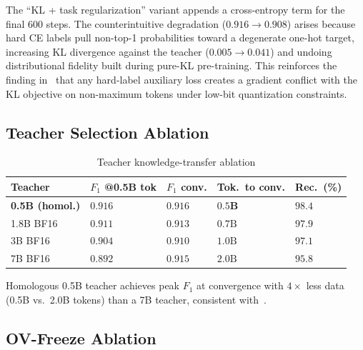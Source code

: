 \documentclass[lettersize,journal]{IEEEtran}
\begin{document}
The ``KL + task regularization'' variant appends a cross-entropy term
for the final 600 steps.  The counterintuitive degradation
($0.916\rightarrow0.908$) arises because hard CE labels pull
non-top-1 probabilities toward a degenerate one-hot target, increasing
KL divergence against the teacher ($0.005\rightarrow0.041$) and
undoing distributional fidelity built during pure-KL pre-training.
This reinforces the finding in~\cite{3} that any hard-label auxiliary
loss creates a gradient conflict with the KL objective on non-maximum
tokens under low-bit quantization constraints.

\subsection{Teacher Selection Ablation}

\begin{table}[htbp]
\caption{Teacher knowledge-transfer ablation}
\label{tab6}
\centering
\renewcommand{\arraystretch}{1.15}
\small
\setlength{\tabcolsep}{4pt}
\begin{tabular}{l>{\centering\arraybackslash}p{1.05cm}%
                 >{\centering\arraybackslash}p{1.0cm}%
                 >{\centering\arraybackslash}p{1.05cm}%
                 >{\centering\arraybackslash}p{1.0cm}}
\toprule
\textbf{Teacher} & \textbf{$F_1$ @0.5B tok} & \textbf{$F_1$ conv.} & \textbf{Tok.\ to conv.} & \textbf{Rec.\ (\%)} \\
\midrule
\textbf{0.5B (homol.)} & $\mathbf{0.916}$ & $\mathbf{0.916}$ & $\mathbf{0.5\text{B}}$ & $\mathbf{98.4}$ \\
1.8B BF16 & $0.911$ & $0.913$ & $0.7\text{B}$ & $97.9$ \\
3B BF16   & $0.904$ & $0.910$ & $1.0\text{B}$ & $97.1$ \\
7B BF16   & $0.892$ & $0.915$ & $2.0\text{B}$ & $95.8$ \\
\bottomrule
\end{tabular}
\end{table}

Homologous 0.5B teacher achieves peak $F_1$ at convergence with
$4\times$ less data (0.5B vs.\ 2.0B tokens) than a 7B teacher,
consistent with~\cite{3}.

\subsection{OV-Freeze Ablation}
\label{sec:ovf_ablation}
\end{document}
